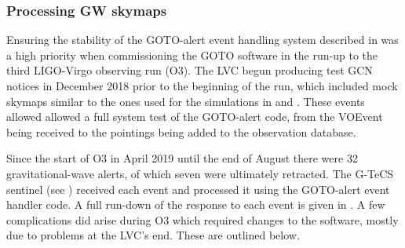\begin{colsection}
\clearpage

\subsubsection{Processing GW skymaps}

Ensuring the stability of the GOTO-alert event handling system described in  was a high priority when commissioning the GOTO software in the run-up to the third LIGO-Virgo observing run (O3). The LVC begun producing test GCN notices in December 2018 prior to the beginning of the run, which included mock skymaps similar to the ones used for the simulations in  and . These events allowed allowed a full system test of the GOTO-alert code, from the VOEvent being received to the pointings being added to the observation database.

Since the start of O3 in April 2019 until the end of August there were 32 gravitational-wave alerts, of which seven were ultimately retracted. The G-TeCS sentinel (see ) received each event and processed it using the GOTO-alert event handler code. A full run-down of the response to each event is given in . A few complications did arise during O3 which required changes to the software, mostly due to problems at the LVC's end. These are outlined below.


\end{colsection}
